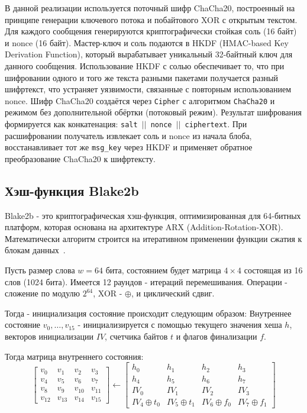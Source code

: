 \documentclass[areasetadvanced]{scrartcl}
\begin{document}
В данной реализации используется поточный шифр ChaCha20, построенный на принципе генерации ключевого потока и побайтового XOR с открытым текстом. Для каждого сообщения генерируются криптографически стойкая соль (16 байт) и nonce (16 байт). Мастер-ключ и соль подаются в HKDF (HMAC-based Key Derivation Function), который вырабатывает уникальный 32-байтный ключ для данного сообщения. Использование HKDF с солью обеспечивает то, что при шифровании одного и того же текста разными пакетами получается разный шифртекст, что устраняет уязвимости, связанные с повторным использованием nonce. Шифр ChaCha20 создаётся через \texttt{Cipher} с алгоритмом \texttt{ChaCha20} и режимом без дополнительной обёртки (потоковый режим). Результат шифрования формируется как конкатенация: \texttt{salt $||$ nonce $||$ ciphertext}. При расшифровании получатель извлекает соль и nonce из начала блоба, восстанавливает тот же \texttt{msg\_key} через HKDF и применяет обратное преобразование ChaCha20 к шифртексту.

\subsection{Хэш-функция Blake2b}
Blake2b - это криптографическая хэш-функция, оптимизированная для 64-битных платформ, которая основана на архитектуре ARX (Addition-Rotation-XOR). Математически алгоритм строится на итеративном применении функции сжатия к блокам данных~\cite{blake2b}.

Пусть размер слова $w = 64$ бита, состоянием будет матрица $4 \times 4$ состоящая из 16 слов (1024 бита). 
Имеется 12 раундов - итераций перемешивания. Операции - сложение по модулю $2^{64}$, XOR - $\oplus$, и циклический сдвиг.

Тогда - инициализация состояние происходит следующим образом:
Внутреннее состояние $v_0, \dots, v_15$ - инициализируется с помощью текущего значения хеша $h$, векторов инициализации $IV$, счетчика байтов $t$ и флагов 
финализации $f$.

Тогда матрица внутреннего состояния:
$$
\begin{bmatrix}
    v_0 & v_1 & v_2 & v_3 \\
    v_4 & v_5 & v_6 & v_7 \\
    v_8 & v_9 & v_{10} & v_{11} \\
    v_{12} & v_{13} & v_{14} & v_{15}
\end{bmatrix} \leftarrow 
\begin{bmatrix}
    h_0 & h_1 & h_2 & h_3 \\
    h_4 & h_5 & h_6 & h_7 \\
    IV_0 & IV_1 & IV_2 & IV_3 \\
    IV_4 \oplus t_0 & IV_5 \oplus t_1 & IV_6 \oplus f_0 & IV_7 \oplus f_1 
\end{bmatrix}
$$
\end{document}
